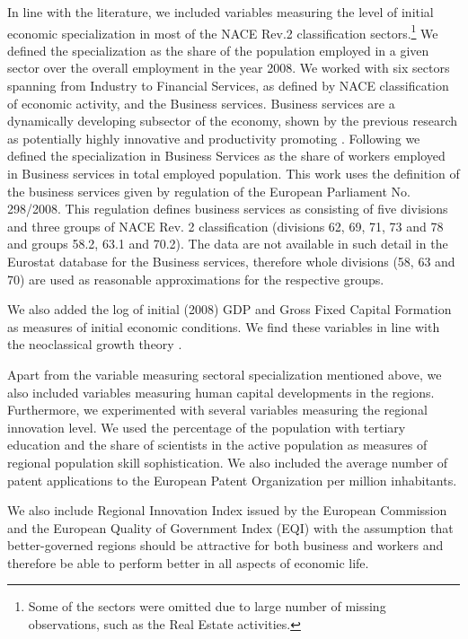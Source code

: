 \documentclass[11pt]{article}
\begin{document}
In line with the literature, we included variables measuring the level of initial economic specialization in most of the NACE Rev.2 classification sectors.\footnote{Some of the sectors were omitted due to large number of missing observations, such as the Real Estate activities.} We defined the specialization as the share of the population employed in a given sector over the overall employment in the year 2008. We worked with six sectors spanning from Industry to Financial Services, as defined by NACE classification of economic activity, and the Business services. Business services are a dynamically developing subsector of the economy, shown by the previous research as potentially highly innovative and productivity promoting \citep{corrocher2014kibs}. Following \citet{guastella2015knowledge} we defined the specialization in Business Services as the share of workers employed in Business services in total employed population. This work uses the definition of the business services given by regulation of the European Parliament No. 298/2008. This regulation defines business services as consisting of five divisions and three groups of NACE Rev. 2 classification (divisions 62, 69, 71, 73 and 78 and groups 58.2, 63.1 and 70.2). The data are not available in such detail in the Eurostat database for the Business services, therefore whole divisions (58, 63 and 70) are used as reasonable approximations for the respective groups.

We also added the log of initial (2008) GDP and Gross Fixed Capital Formation as measures of initial economic conditions. We find these variables in line with the neoclassical growth theory \cite{iammarino2017regional}.%

Apart from the variable measuring sectoral specialization mentioned above, we also included variables measuring human capital developments in the regions. Furthermore, we experimented with several variables measuring the regional innovation level. We used the percentage of the population with tertiary education and the share of scientists in the active population as measures of regional population skill sophistication. We also included the average number of patent applications to the European Patent Organization per million inhabitants. 

We also include Regional Innovation Index issued by the European Commission and the European Quality of Government Index (EQI) with the assumption that better-governed regions should be attractive for both business and workers and therefore be able to perform better in all aspects of economic life.
\end{document}
